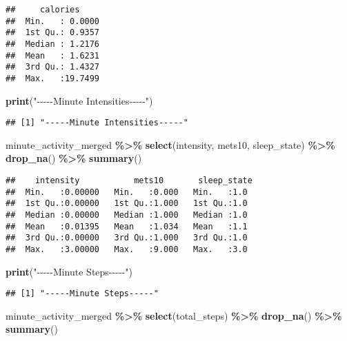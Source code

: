 \documentclass[
]{article}
\newenvironment{Shaded}{\begin{snugshade}}{\end{snugshade}}
\newcommand{\FunctionTok}[1]{\textcolor[rgb]{0.13,0.29,0.53}{\textbf{#1}}}
\newcommand{\NormalTok}[1]{#1}
\newcommand{\SpecialCharTok}[1]{\textcolor[rgb]{0.81,0.36,0.00}{\textbf{#1}}}
\newcommand{\StringTok}[1]{\textcolor[rgb]{0.31,0.60,0.02}{#1}}
\begin{document}
\begin{verbatim}
##     calories      
##  Min.   : 0.0000  
##  1st Qu.: 0.9357  
##  Median : 1.2176  
##  Mean   : 1.6231  
##  3rd Qu.: 1.4327  
##  Max.   :19.7499
\end{verbatim}

\begin{Shaded}
\begin{Highlighting}[]
\FunctionTok{print}\NormalTok{(}\StringTok{"{-}{-}{-}{-}{-}Minute Intensities{-}{-}{-}{-}{-}"}\NormalTok{)}
\end{Highlighting}
\end{Shaded}

\begin{verbatim}
## [1] "-----Minute Intensities-----"
\end{verbatim}

\begin{Shaded}
\begin{Highlighting}[]
\NormalTok{minute\_activity\_merged }\SpecialCharTok{\%\textgreater{}\%} 
 \FunctionTok{select}\NormalTok{(intensity, mets10, sleep\_state) }\SpecialCharTok{\%\textgreater{}\%} 
 \FunctionTok{drop\_na}\NormalTok{() }\SpecialCharTok{\%\textgreater{}\%} 
 \FunctionTok{summary}\NormalTok{()}
\end{Highlighting}
\end{Shaded}

\begin{verbatim}
##    intensity           mets10       sleep_state 
##  Min.   :0.00000   Min.   :0.000   Min.   :1.0  
##  1st Qu.:0.00000   1st Qu.:1.000   1st Qu.:1.0  
##  Median :0.00000   Median :1.000   Median :1.0  
##  Mean   :0.01395   Mean   :1.034   Mean   :1.1  
##  3rd Qu.:0.00000   3rd Qu.:1.000   3rd Qu.:1.0  
##  Max.   :3.00000   Max.   :9.000   Max.   :3.0
\end{verbatim}

\begin{Shaded}
\begin{Highlighting}[]
\FunctionTok{print}\NormalTok{(}\StringTok{"{-}{-}{-}{-}{-}Minute Steps{-}{-}{-}{-}{-}"}\NormalTok{)}
\end{Highlighting}
\end{Shaded}

\begin{verbatim}
## [1] "-----Minute Steps-----"
\end{verbatim}

\begin{Shaded}
\begin{Highlighting}[]
\NormalTok{minute\_activity\_merged }\SpecialCharTok{\%\textgreater{}\%} 
 \FunctionTok{select}\NormalTok{(total\_steps) }\SpecialCharTok{\%\textgreater{}\%} 
 \FunctionTok{drop\_na}\NormalTok{() }\SpecialCharTok{\%\textgreater{}\%} 
 \FunctionTok{summary}\NormalTok{()}
\end{Highlighting}
\end{Shaded}
\end{document}
